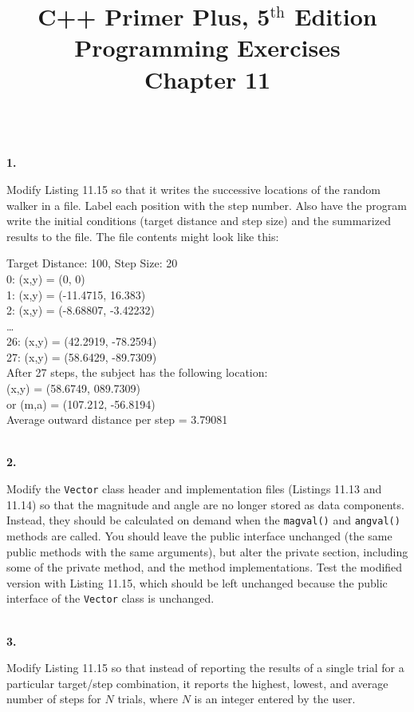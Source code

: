 \documentclass[10 pt]{amsart}
\newlength{\cwidth}
\newenvironment{cpart}[2][\cwidth]
	{%
		\\ %
		\textbf{#2. }%
		\begin{minipage}[t]{#1}%
		\setlength{\parindent}{0pt}%
		\setlength{\parskip}{2ex}%
	}
	{%
		\end{minipage}%
	}
\newcommand{\ttt}[1]{\texttt{#1}}
\newcommand{\ChapNum}{11}
\begin{document}
	\title
	[Chapter \ChapNum]
	{C++ Primer Plus, 5$^\text{th}$ Edition \\
	Programming Exercises \\
	Chapter \ChapNum}

	\maketitle

	\begin{cpart}{1}
		Modify Listing 11.15 so that it writes the successive locations
		of the random walker in a file.
		Label each position with the step number.
		Also have the program write the initial conditions (target
		distance and step size) and the summarized results to the
		file.
		The file contents might look like this:

		{\ttfamily
			Target Distance: 100, Step Size: 20 \\
			0: (x,y) = (0, 0) \\
			1: (x,y) = (-11.4715, 16.383) \\
			2: (x,y) = (-8.68807, -3.42232) \\
			\ldots \\
			26: (x,y) = (42.2919, -78.2594) \\
			27: (x,y) = (58.6429, -89.7309) \\
			After 27 steps, the subject has the following location: \\
			(x,y) = (58.6749, 089.7309) \\
			or
			(m,a) = (107.212, -56.8194) \\
			Average outward distance per step = 3.79081
		}
	\end{cpart}

	\begin{cpart}{2}
		Modify the \ttt{Vector} class header and implementation files
		(Listings 11.13 and 11.14) so that the magnitude and angle are
		no longer stored as data components.
		Instead, they should be calculated on demand when the
		\ttt{magval()} and \ttt{angval()} methods are called.
		You should leave the public interface unchanged (the same 
		public methods with the same arguments), but alter the private
		section, including some of the private method, and the 
		method implementations.
		Test the modified version with Listing 11.15, which
		should be left unchanged because the public interface of the
		\ttt{Vector} class is unchanged.
	\end{cpart}

	\begin{cpart}{3}
		Modify Listing 11.15 so that instead of reporting the results
		of a single trial for a particular target/step combination, 
		it reports the highest, lowest, and average number of steps
		for $N$ trials, where $N$ is an integer entered by the user.
	\end{cpart}
\end{document}
